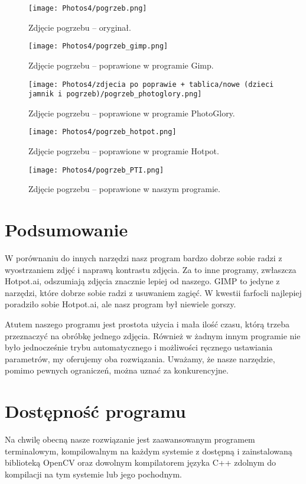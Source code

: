 \documentclass[]{mwart}
\begin{document}
\begin{figure}[H]
    \centering
    \texttt{[image: Photos4/pogrzeb.png]}
    \caption{Zdjęcie pogrzebu -- oryginał.}
\end{figure}
\begin{figure}[H]
    \centering
    \texttt{[image: Photos4/pogrzeb\_gimp.png]}
    \caption{Zdjęcie pogrzebu -- poprawione w programie Gimp. }
\end{figure}
\begin{figure}[H]
    \centering
    \texttt{[image: Photos4/zdjecia po poprawie + tablica/nowe (dzieci jamnik i pogrzeb)/pogrzeb\_photoglory.png]}
    \caption{Zdjęcie pogrzebu -- poprawione w programie PhotoGlory. }
\end{figure}
\begin{figure}[H]
    \centering
    \texttt{[image: Photos4/pogrzeb\_hotpot.png]}
    \caption{Zdjęcie pogrzebu -- poprawione w programie Hotpot. }
\end{figure}
\begin{figure}[H]
    \centering
    \texttt{[image: Photos4/pogrzeb\_PTI.png]}
    \caption{Zdjęcie pogrzebu -- poprawione w naszym programie.}
\end{figure}


\section{Podsumowanie}
W porównaniu do innych narzędzi nasz program bardzo dobrze sobie radzi z wyostrzaniem zdjęć i naprawą kontrastu zdjęcia. Za to inne programy, zwłaszcza Hotpot.ai, odszumiają zdjęcia znacznie lepiej od naszego. GIMP to jedyne z narzędzi, które dobrze sobie radzi z usuwaniem zagięć. W kwestii farfocli najlepiej poradziło sobie Hotpot.ai, ale nasz program był niewiele gorszy.

Atutem naszego programu jest prostota użycia i mała ilość czasu, którą trzeba przeznaczyć na obróbkę jednego zdjęcia. Również w żadnym innym programie nie było jednocześnie trybu automatycznego i możliwości ręcznego ustawiania parametrów, my oferujemy oba rozwiązania. Uważamy, że nasze narzędzie, pomimo pewnych ograniczeń, można uznać za konkurencyjne.








\newpage
\section{Dostępność programu}
Na chwilę obecną nasze rozwiązanie jest zaawansowanym programem terminalowym,
kompilowalnym na każdym systemie z dostępną i zainstalowaną biblioteką OpenCV oraz
dowolnym kompilatorem języka C++ zdolnym do kompilacji na tym systemie lub jego pochodnym.
\end{document}

